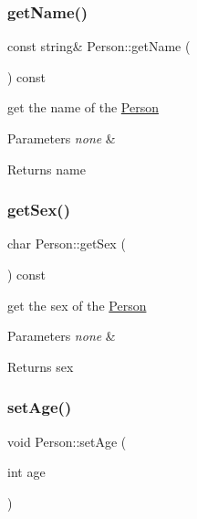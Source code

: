 \subsubsection{\texorpdfstring{get\+Name()}{getName()}}
{\footnotesize\ttfamily const string\& Person\+::get\+Name (\begin{DoxyParamCaption}{ }\end{DoxyParamCaption}) const\hspace{0.3cm}{\ttfamily [inline]}}

get the name of the \hyperlink{classPerson}{Person}


\begin{DoxyParams}{Parameters}
{\em none} & \\
\hline
\end{DoxyParams}
\begin{DoxyReturn}{Returns}
name 
\end{DoxyReturn}
\mbox{\label{classPerson_a0cb92dfb78e6f780829188e6b38a42bf}} 
\subsubsection{\texorpdfstring{get\+Sex()}{getSex()}}
{\footnotesize\ttfamily char Person\+::get\+Sex (\begin{DoxyParamCaption}{ }\end{DoxyParamCaption}) const\hspace{0.3cm}{\ttfamily [inline]}}

get the sex of the \hyperlink{classPerson}{Person}


\begin{DoxyParams}{Parameters}
{\em none} & \\
\hline
\end{DoxyParams}
\begin{DoxyReturn}{Returns}
sex 
\end{DoxyReturn}
\mbox{\label{classPerson_ac8ade54c27a0657c987c395ff04a9d46}} 
\subsubsection{\texorpdfstring{set\+Age()}{setAge()}}
{\footnotesize\ttfamily void Person\+::set\+Age (\begin{DoxyParamCaption}\item[{int}]{age }\end{DoxyParamCaption})\hspace{0.3cm}{\ttfamily [inline]}}

